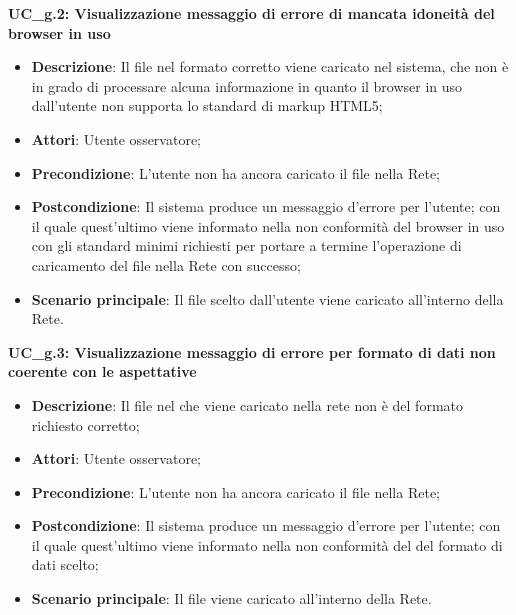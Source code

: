 \textbf{UC\_g.2: Visualizzazione messaggio di errore di mancata idoneità del browser in uso}\mbox{}
\label{UC_g.2: Visualizzazione messaggio di errore di mancata idoneita del browser in uso}
\begin{itemize}
\item \textbf{Descrizione}: Il file nel formato corretto viene caricato nel sistema, che non \`e in grado di processare alcuna informazione in quanto il browser in uso dall'utente non supporta lo standard di markup HTML5;
\item \textbf{Attori}: Utente osservatore;
\item \textbf{Precondizione}: L'utente non ha ancora caricato il file nella Rete;
\item \textbf{Postcondizione}: Il sistema produce un messaggio d'errore per l'utente; con il quale quest'ultimo viene informato nella non conformit\`a del browser in uso con gli standard minimi richiesti per portare a termine l'operazione di caricamento del file nella Rete con successo;
\item \textbf{Scenario principale}: Il file scelto dall'utente viene caricato all'interno della Rete.
\end{itemize}


\textbf{UC\_g.3: Visualizzazione messaggio di errore per formato di dati non coerente con le aspettative}\mbox{}
\label{UC_g.3: Visualizzazione messaggio di errore per formato di dati non coerente con le aspettative}
\begin{itemize}
\item \textbf{Descrizione}: Il file nel che viene caricato nella rete non \`e del formato richiesto corretto;
\item \textbf{Attori}: Utente osservatore;
\item \textbf{Precondizione}: L'utente non ha ancora caricato il file nella Rete;
\item \textbf{Postcondizione}: Il sistema produce un messaggio d'errore per l'utente; con il quale quest'ultimo viene informato nella non conformit\`a del del formato di dati scelto;
\item \textbf{Scenario principale}: Il file viene caricato all'interno della Rete.
\end{itemize}
 
